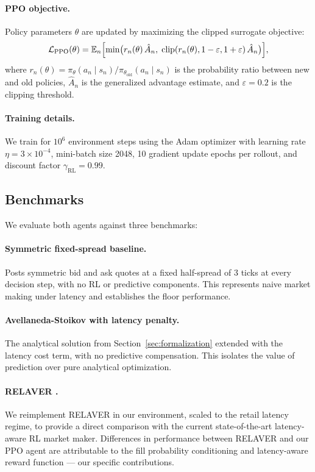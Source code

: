 \documentclass[12pt]{article}
\begin{document}
\paragraph{PPO objective.} Policy parameters $\theta$ are updated by maximizing the clipped surrogate objective:
\begin{equation}
  \mathcal{L}_{\mathrm{PPO}}(\theta) = \mathbb{E}_n\Bigl[
    \min\bigl(r_n(\theta)\,\hat{A}_n,\;
    \mathrm{clip}(r_n(\theta), 1-\varepsilon, 1+\varepsilon)\,\hat{A}_n\bigr)
  \Bigr],
\end{equation}
where $r_n(\theta) = \pi_\theta(a_n \mid s_n) / \pi_{\theta_{\mathrm{old}}}(a_n \mid s_n)$ is the probability ratio between new and old policies, $\hat{A}_n$ is the generalized advantage estimate, and $\varepsilon = 0.2$ is the clipping threshold.

\paragraph{Training details.} We train for $10^6$ environment steps using the Adam optimizer with learning rate $\eta = 3 \times 10^{-4}$, mini-batch size 2048, 10 gradient update epochs per rollout, and discount factor $\gamma_{\mathrm{RL}} = 0.99$.

\subsection{Benchmarks}

We evaluate both agents against three benchmarks:

\paragraph{Symmetric fixed-spread baseline.} Posts symmetric bid and ask quotes at a fixed half-spread of 3 ticks at every decision step, with no RL or predictive components. This represents naive market making under latency and establishes the floor performance.

\paragraph{Avellaneda-Stoikov with latency penalty.} The analytical solution from Section~\ref{sec:formalization} extended with the latency cost term, with no predictive compensation. This isolates the value of prediction over pure analytical optimization.

\paragraph{RELAVER \citep{jiang2025}.} We reimplement RELAVER in our environment, scaled to the retail latency regime, to provide a direct comparison with the current state-of-the-art latency-aware RL market maker. Differences in performance between RELAVER and our PPO agent are attributable to the fill probability conditioning and latency-aware reward function --- our specific contributions.
\end{document}
